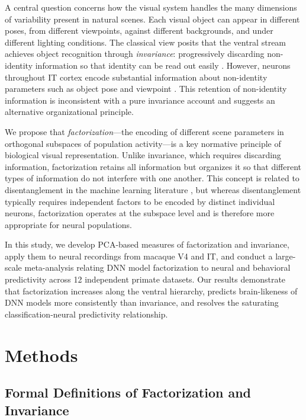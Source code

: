 \documentclass[11pt]{article}
\begin{document}
A central question concerns how the visual system handles the many dimensions of variability present in natural scenes. Each visual object can appear in different poses, from different viewpoints, against different backgrounds, and under different lighting conditions. The classical view posits that the ventral stream achieves object recognition through \emph{invariance}: progressively discarding non-identity information so that identity can be read out easily \citep{rust2010}. However, neurons throughout IT cortex encode substantial information about non-identity parameters such as object pose and viewpoint \citep{hong2016, ponce2019}. This retention of non-identity information is inconsistent with a pure invariance account and suggests an alternative organizational principle.

We propose that \emph{factorization}---the encoding of different scene parameters in orthogonal subspaces of population activity---is a key normative principle of biological visual representation. Unlike invariance, which requires discarding information, factorization retains all information but organizes it so that different types of information do not interfere with one another. This concept is related to disentanglement in the machine learning literature \citep{higgins2018, bengio2013}, but whereas disentanglement typically requires independent factors to be encoded by distinct individual neurons, factorization operates at the subspace level and is therefore more appropriate for neural populations.

In this study, we develop PCA-based measures of factorization and invariance, apply them to neural recordings from macaque V4 and IT, and conduct a large-scale meta-analysis relating DNN model factorization to neural and behavioral predictivity across 12 independent primate datasets. Our results demonstrate that factorization increases along the ventral hierarchy, predicts brain-likeness of DNN models more consistently than invariance, and resolves the saturating classification-neural predictivity relationship.

\section{Methods}

\subsection{Formal Definitions of Factorization and Invariance}
\end{document}
